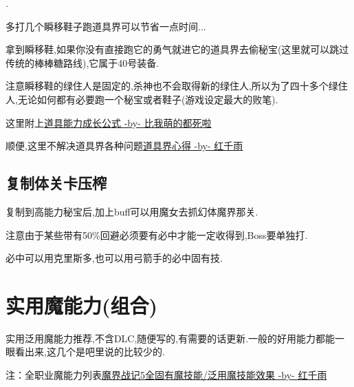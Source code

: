 		{\color{red}{即便没有这里也建议用2000万能力挑战下,整个游戏挑战关已经没几个了,如果觉得困难可以参考后面修罗篇的巴尔攻略}}.

		多打几个瞬移鞋子跑道具界可以节省一点时间...

		拿到瞬移鞋,如果你没有直接跑它的勇气就进它的道具界去偷秘宝(这里就可以跳过传统的棒棒糖路线),它属于40号装备.

		注意瞬移鞋的绿住人是固定的,杀神也不会取得新的绿住人,所以为了四十多个绿住人,无论如何都有必要跑一个秘宝或者鞋子(游戏设定最大的败笔).

		这里附上\href{http://tieba.baidu.com/f?kz=3834692385}{道具能力成长公式 -by- 比我萌的都死啦}

		顺便,这里不解决道具界各种问题\href{http://tieba.baidu.com/p/3730196003}{道具界心得 -by- 红千雨}

		\subsection{复制体关卡压榨}

		复制到高能力秘宝后,加上buff可以用魔女去抓幻体魔界那关.

		注意由于某些带有50\%回避必须要有必中才能一定收得到,Boss要单独打.

		必中可以用克里斯多,也可以用弓箭手的必中固有技.

		

	\newpage

	\section{实用魔能力(组合)}

	实用泛用魔能力推荐,不含DLC,随便写的,有需要的话更新.一般的好用能力都能一眼看出来,这几个是吧里说的比较少的.

	注：全职业魔能力列表\href{http://tieba.baidu.com/p/3765501530}{魔界战记5全固有魔技能/泛用魔技能效果 -by- 红千雨}

